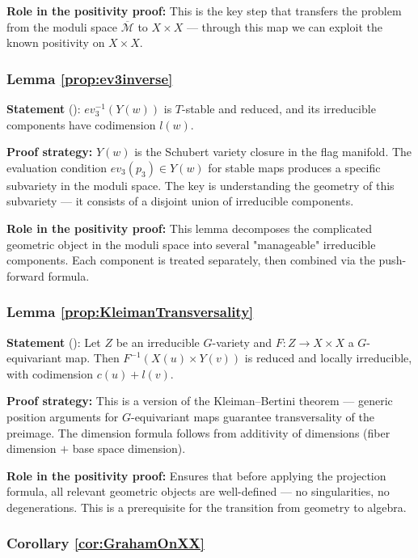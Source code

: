 \textbf{Role in the positivity proof:} This is the key step that transfers the problem from the moduli space $\overline{\mathcal{M}}$ to $X \times X$ --- through this map we can exploit the known positivity on $X \times X$.\ 

\subsubsection{Lemma \cref{prop:ev3inverse}}
\label{sec:ev3inverseDetail}

\textbf{Statement} (\cite[ Lemma 6.4]{Mihalcea}): $ev_3^{-1}(Y(w))$ is $T$-stable and reduced, and its irreducible components have codimension $l(w)$.\ 

\textbf{Proof strategy:} $Y(w)$ is the Schubert variety closure in the flag manifold. The evaluation condition $ev_3(p_3) \in Y(w)$ for stable maps produces a specific subvariety in the moduli space. The key is understanding the geometry of this subvariety --- it consists of a disjoint union of irreducible components.\ 

\textbf{Role in the positivity proof:} This lemma decomposes the complicated geometric object in the moduli space into several "manageable" irreducible components. Each component is treated separately, then combined via the push-forward formula.\ 

\subsubsection{Lemma \cref{prop:KleimanTransversality}}
\label{sec:KleimanDetail}

\textbf{Statement} (\cite[ Lemma 6.3]{Mihalcea}): Let $Z$ be an irreducible $G$-variety and $F: Z \to X \times X$ a $G$-equivariant map. Then $F^{-1}(X(u) \times Y(v))$ is reduced and locally irreducible, with codimension $c(u) + l(v)$.\ 

\textbf{Proof strategy:} This is a version of the Kleiman--Bertini theorem --- generic position arguments for $G$-equivariant maps guarantee transversality of the preimage. The dimension formula follows from additivity of dimensions (fiber dimension $+$ base space dimension).\ 

\textbf{Role in the positivity proof:} Ensures that before applying the projection formula, all relevant geometric objects are well-defined --- no singularities, no degenerations. This is a prerequisite for the transition from geometry to algebra.\ 

\subsubsection{Corollary \cref{cor:GrahamOnXX}}
\label{sec:GrahamOnXXDetail}

